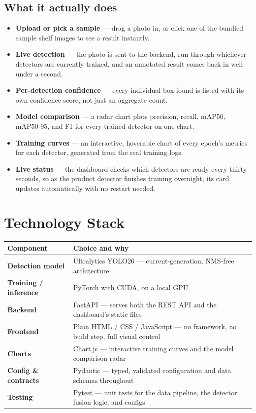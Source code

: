 \documentclass[11pt,a4paper]{article}
\begin{document}
\subsection{What it actually does}
\begin{itemize}
  \item \textbf{Upload or pick a sample} --- drag a photo in, or click one of the bundled sample
        shelf images to see a result instantly.
  \item \textbf{Live detection} --- the photo is sent to the backend, run through whichever
        detectors are currently trained, and an annotated result comes back in well under a
        second.
  \item \textbf{Per-detection confidence} --- every individual box found is listed with its own
        confidence score, not just an aggregate count.
  \item \textbf{Model comparison} --- a radar chart plots precision, recall, mAP50, mAP50-95, and
        F1 for every trained detector on one chart.
  \item \textbf{Training curves} --- an interactive, hoverable chart of every epoch's metrics for
        each detector, generated from the real training logs.
  \item \textbf{Live status} --- the dashboard checks which detectors are ready every thirty
        seconds, so as the product detector finishes training overnight, its card updates
        automatically with no restart needed.
\end{itemize}

\section{Technology Stack}

\begin{table}[h]
\centering
\renewcommand{\arraystretch}{1.3}
\begin{tabular}{@{}>{\bfseries}p{3.1cm} p{11cm}@{}}
\toprule
\textbf{Component} & \textbf{Choice and why} \\
\midrule
Detection model & Ultralytics YOLO26 --- current-generation, NMS-free architecture \\
Training / inference & PyTorch with CUDA, on a local GPU \\
Backend & FastAPI --- serves both the REST API and the dashboard's static files \\
Frontend & Plain HTML / CSS / JavaScript --- no framework, no build step, full visual control \\
Charts & Chart.js --- interactive training curves and the model comparison radar \\
Config \& contracts & Pydantic --- typed, validated configuration and data schemas throughout \\
Testing & Pytest --- unit tests for the data pipeline, the detector fusion logic, and configs \\
\bottomrule
\end{tabular}
\end{table}
\end{document}
